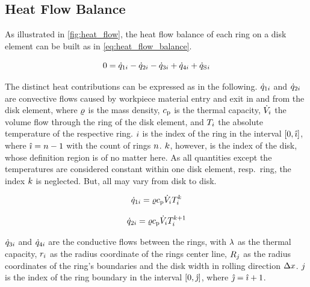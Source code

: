 \documentclass{PyRollDocs}
\begin{document}
    \subsection{Heat Flow Balance}\label{subsec:heat-flow-balance}

    As illustrated in \autoref{fig:heat_flow}, the heat flow balance of each ring on a disk element can be built as in \autoref{eq:heat_flow_balance}.

    \begin{equation}
        0 = {\dot{q}}_{1{i}} - {\dot{q}}_{2{i}} - {\dot{q}}_{3{i}} + {\dot{q}}_{4{i}} + {\dot{q}_\mathrm{S}}{}_{{i}}
        \label{eq:heat_flow_balance}
    \end{equation}

    The distinct heat contributions can be expressed as in the following.
    ${\dot{q}}_{1{i}}$ and ${\dot{q}}_{2{i}}$ are convective flows caused by workpiece material entry and exit in and from the disk element, where ${\varrho}$ is the mass density, ${c_\mathrm{p}}$ is the thermal capacity, ${\dot{V}}_{i}$ the volume flow through the ring of the disk element, and ${T}_{i}$ the absolute temperature of the respective ring.
    ${i}$ is the index of the ring in the interval $[0, {\hat{\imath}}]$, where ${\hat{\imath}} = {n} - 1$ with the count of rings ${n}$.
    ${k}$, however, is the index of the disk, whose definition region is of no matter here.
    As all quantities except the temperatures are considered constant within one disk element, resp.\ ring, the index ${k}$ is neglected.
    But, all may vary from disk to disk.

    \begin{equation}
        {\dot{q}}_{1{i}} = {\varrho} {c_\mathrm{p}} {\dot{V}}_{i} {T}_{{i}}^{{k}}
        \label{eq:heat_flow_1}
    \end{equation}

    \begin{equation}
        {\dot{q}}_{2{i}} = {\varrho} {c_\mathrm{p}} {\dot{V}}_{i} {T}_{{i}}^{{k}+1}
        \label{eq:heat_flow_2}
    \end{equation}

    ${\dot{q}}_{3{i}}$ and ${\dot{q}}_{4{i}}$ are the conductive flows between the rings, with ${\lambda}$ as the thermal capacity, ${r}_{i}$ as the radius coordinate of the rings center line, ${R}_{j}$ as the radius coordinates of the ring's boundaries and the disk width in rolling direction ${\Delta x}$.
    ${j}$ is the index of the ring boundary in the interval $[0, {\hat{\jmath}}]$, where ${\hat{\jmath}} = {\hat{\imath}} + 1$.
\end{document}
